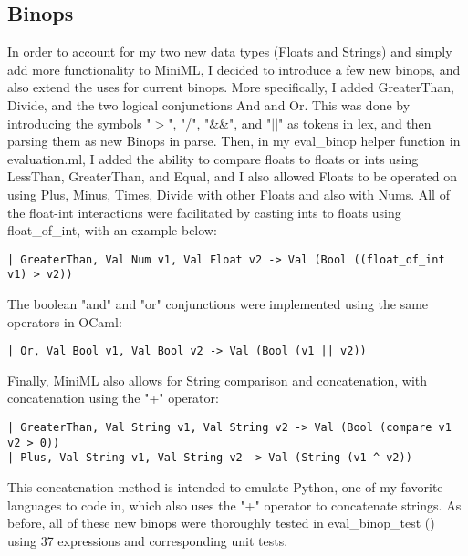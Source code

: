 \documentclass{article}
\begin{document}
\subsection*{Binops}
In order to account for my two new data types (Floats and Strings) and simply add more functionality to MiniML, I decided to introduce a few new binops, and also extend the uses for current binops. More specifically, I added GreaterThan, Divide, and the two logical conjunctions And and Or. This was done by introducing the symbols "$>$", "/", "\&\&", and "$||$" as tokens in lex, and then parsing them as new Binops in parse. Then, in my eval\_binop helper function in evaluation.ml, I added the ability to compare floats to floats or ints using LessThan, GreaterThan, and Equal, and I also allowed Floats to be operated on using Plus, Minus, Times, Divide with other Floats and also with Nums. All of the float-int interactions were facilitated by casting ints to floats using float\_of\_int, with an example below: 
\begin{verbatim}
| GreaterThan, Val Num v1, Val Float v2 -> Val (Bool ((float_of_int v1) > v2))
\end{verbatim}
The boolean "and" and "or" conjunctions were implemented using the same operators in OCaml:
\begin{verbatim}
| Or, Val Bool v1, Val Bool v2 -> Val (Bool (v1 || v2))
\end{verbatim}
Finally, MiniML also allows for String comparison and concatenation, with concatenation using the "+" operator:
\begin{verbatim}
| GreaterThan, Val String v1, Val String v2 -> Val (Bool (compare v1 v2 > 0))
| Plus, Val String v1, Val String v2 -> Val (String (v1 ^ v2))
\end{verbatim}
This concatenation method is intended to emulate Python, one of my favorite languages to code in, which also uses the "+" operator to concatenate strings. As before, all of these new binops were thoroughly tested in eval\_binop\_test () using 37 expressions and corresponding unit tests. 

\pagebreak
\end{document}
